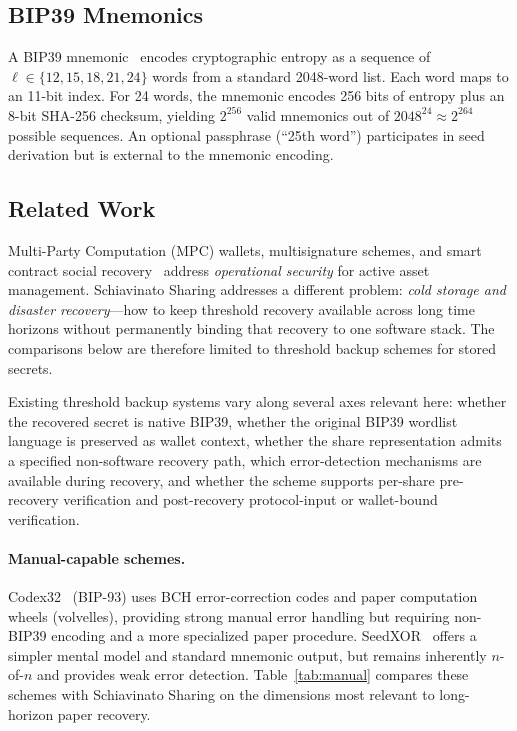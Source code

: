 \documentclass[11pt]{article}
\begin{document}
\subsection{BIP39 Mnemonics}

A BIP39 mnemonic~\cite{bip39} encodes cryptographic entropy as a sequence of $\ell \in \{12, 15, 18, 21, 24\}$ words from a standard 2048-word list. Each word maps to an 11-bit index. For 24 words, the mnemonic encodes 256 bits of entropy plus an 8-bit SHA-256 checksum, yielding $2^{256}$ valid mnemonics out of $2048^{24} \approx 2^{264}$ possible sequences. An optional passphrase (``25th word'') participates in seed derivation but is external to the mnemonic encoding.

\subsection{Related Work}

Multi-Party Computation (MPC) wallets, multisignature schemes, and smart contract social recovery~\cite{buterin} address \emph{operational security} for active asset management. Schiavinato Sharing addresses a different problem: \emph{cold storage and disaster recovery}---how to keep threshold recovery available across long time horizons without permanently binding that recovery to one software stack. The comparisons below are therefore limited to threshold backup schemes for stored secrets.

Existing threshold backup systems vary along several axes relevant here: whether the recovered secret is native BIP39, whether the original BIP39 wordlist language is preserved as wallet context, whether the share representation admits a specified non-software recovery path, which error-detection mechanisms are available during recovery, and whether the scheme supports per-share pre-recovery verification and post-recovery protocol-input or wallet-bound verification.

\paragraph{Manual-capable schemes.} Codex32~\cite{codex32} (BIP-93) uses BCH error-correction codes and paper computation wheels (volvelles), providing strong manual error handling but requiring non-BIP39 encoding and a more specialized paper procedure. SeedXOR~\cite{seedxor} offers a simpler mental model and standard mnemonic output, but remains inherently $n$-of-$n$ and provides weak error detection. Table~\ref{tab:manual} compares these schemes with Schiavinato Sharing on the dimensions most relevant to long-horizon paper recovery.
\end{document}
